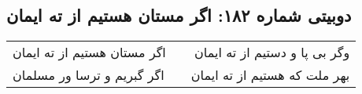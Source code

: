\begin{center}
\section*{دوبیتی شماره ۱۸۲: اگر مستان هستیم از ته ایمان}
\label{sec:182}
\begin{longtable}{l p{0.5cm} r}
اگر مستان هستیم از ته ایمان
&&
وگر بی پا و دستیم از ته ایمان
\\
اگر گبریم و ترسا ور مسلمان
&&
بهر ملت که هستیم از ته ایمان
\\
\end{longtable}
\end{center}
